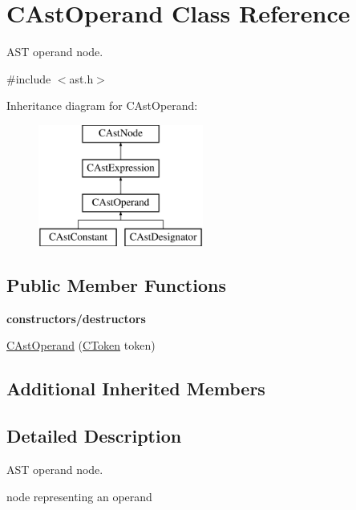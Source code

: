 \hypertarget{classCAstOperand}{\section{C\-Ast\-Operand Class Reference}
\label{classCAstOperand}
}


A\-S\-T operand node.  




{\ttfamily \#include $<$ast.\-h$>$}

Inheritance diagram for C\-Ast\-Operand\-:\begin{figure}[H]
\begin{center}
\leavevmode
\includegraphics[height=4.000000cm]{classCAstOperand}
\end{center}
\end{figure}
\subsection*{Public Member Functions}
\begin{Indent}{\bf constructors/destructors}\par
\begin{DoxyCompactItemize}
\item 
\hyperlink{classCAstOperand_ada9bca7d498c08c9b47ac4a8acb3436f}{C\-Ast\-Operand} (\hyperlink{classCToken}{C\-Token} token)
\end{DoxyCompactItemize}
\end{Indent}
\subsection*{Additional Inherited Members}


\subsection{Detailed Description}
A\-S\-T operand node. 

node representing an operand 

